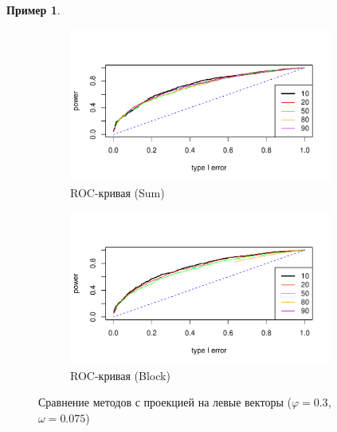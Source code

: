 \documentclass[specialist,
substylefile = spbu_report.rtx,
subf,href,colorlinks=true, 12pt]{disser}
\theoremstyle{definition}
\newtheorem{example}{Пример}
\begin{document}
\begin{example}
\begin{figure}[h!]
		\bigskip
		\begin{subfigure}[t]{0.5\textwidth}
			\centering
			\includegraphics[width=0.95\textwidth]{img/roc_sum_ev_phi3_omega0075.pdf}
			\caption{ROC-кривая (Sum)}
		\end{subfigure}\hspace{\fill}
		\begin{subfigure}[t]{0.5\textwidth}
			\centering
			\includegraphics[width=0.95\textwidth]{img/roc_block_ev_phi3_omega0075.pdf}
			\caption{ROC-кривая (Block)}
		\end{subfigure}
		\caption{Сравнение методов с проекцией на левые векторы ($\varphi=0.3$, $\omega=0.075$)}
		\label{fig:sum_block_ev_phi3}
	\end{figure}


\end{example}
\end{document}
